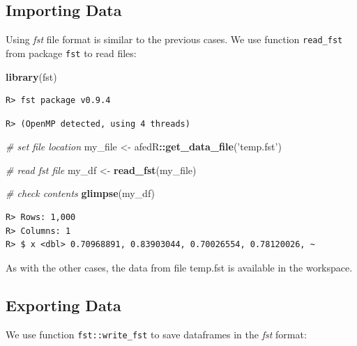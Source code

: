 \documentclass[
  12pt,
]{book}
\newenvironment{Shaded}{\begin{snugshade}}{\end{snugshade}}
\newcommand{\CommentTok}[1]{\textcolor[rgb]{0.37,0.37,0.37}{\textit{#1}}}
\newcommand{\KeywordTok}[1]{\textcolor[rgb]{0.27,0.27,0.27}{\textbf{#1}}}
\newcommand{\NormalTok}[1]{#1}
\newcommand{\OperatorTok}[1]{\textcolor[rgb]{0.43,0.43,0.43}{\textbf{#1}}}
\newcommand{\StringTok}[1]{\textcolor[rgb]{0.5,0.5,0.5}{#1}}
\begin{document}
\hypertarget{importing-data-3}{%
\subsection{Importing Data}\label{importing-data-3}}

Using \emph{fst} file format is similar to the previous cases. We use function \texttt{read\_fst} from package \texttt{fst} \citep{R-fst} to read files:

\begin{Shaded}
\begin{Highlighting}[]
\KeywordTok{library}\NormalTok{(fst)}
\end{Highlighting}
\end{Shaded}

\begin{verbatim}
R> fst package v0.9.4
\end{verbatim}

\begin{verbatim}
R> (OpenMP detected, using 4 threads)
\end{verbatim}

\begin{Shaded}
\begin{Highlighting}[]
\CommentTok{# set file location}
\NormalTok{my_file <-}\StringTok{ }\NormalTok{afedR}\OperatorTok{::}\KeywordTok{get_data_file}\NormalTok{(}\StringTok{'temp.fst'}\NormalTok{)}

\CommentTok{# read fst file}
\NormalTok{my_df <-}\StringTok{ }\KeywordTok{read_fst}\NormalTok{(my_file)}

\CommentTok{# check contents}
\KeywordTok{glimpse}\NormalTok{(my_df)}
\end{Highlighting}
\end{Shaded}

\begin{verbatim}
R> Rows: 1,000
R> Columns: 1
R> $ x <dbl> 0.70968891, 0.83903044, 0.70026554, 0.78120026, ~
\end{verbatim}

As with the other cases, the data from file temp.fst is available in the workspace. 

\hypertarget{exporting-data-3}{%
\subsection{Exporting Data}\label{exporting-data-3}}

We use function \texttt{fst::write\_fst} to save dataframes in the \emph{fst} format: 
\end{document}
